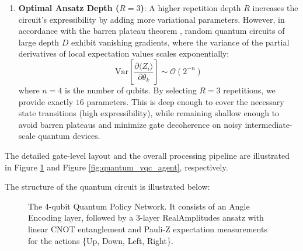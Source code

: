 \documentclass[12pt, a4paper]{article}
\begin{document}
\begin{enumerate}
    \item \textbf{Optimal Ansatz Depth ($R = 3$)}: 
    A higher repetition depth $R$ increases the circuit's expressibility by adding more variational parameters. However, in accordance with the barren plateau theorem \cite{mcclean2018}, random quantum circuits of large depth $D$ exhibit vanishing gradients, where the variance of the partial derivatives of local expectation values scales exponentially:
    \begin{equation}
        \text{Var}\left[\frac{\partial \langle Z_i \rangle}{\partial \theta_k}\right] \sim \mathcal{O}(2^{-n})
    \end{equation}
    where $n = 4$ is the number of qubits. By selecting $R=3$ repetitions, we provide exactly $16$ parameters. This is deep enough to cover the necessary state transitions (high expressibility), while remaining shallow enough to avoid barren plateaus and minimize gate decoherence on noisy intermediate-scale quantum devices.
\end{enumerate}

The detailed gate-level layout and the overall processing pipeline are illustrated in Figure \ref{fig:quantum_circuit} and Figure \ref{fig:quantum_vqc_agent}, respectively.

The structure of the quantum circuit is illustrated below:

\begin{figure}[H]
    \centering
    \caption{The 4-qubit Quantum Policy Network. It consists of an Angle Encoding layer, followed by a 3-layer RealAmplitudes ansatz with linear CNOT entanglement and Pauli-Z expectation measurements for the actions \{Up, Down, Left, Right\}.}
    \label{fig:quantum_circuit}
\end{figure}
\end{document}
